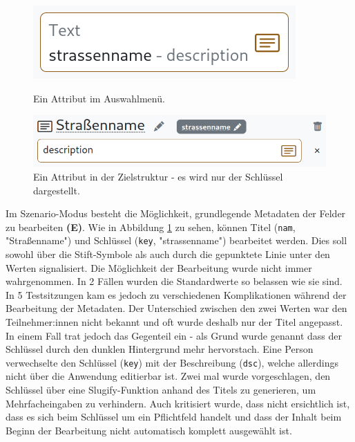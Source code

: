 \begin{figure}[!ht]
  \includegraphics[width=\linewidth]{assets/attribute-source.png}
  \caption{Ein Attribut im Auswahlmenü.}
  \label{fig:attribute-source}
  \endminipage
  \hfill
  \includegraphics[width=\linewidth]{assets/attribute-target.png}
  \caption{Ein Attribut in der Zielstruktur - es wird nur der Schlüssel dargestellt.}
  \label{fig:attribute-target}
  \endminipage
\end{figure}

Im Szenario-Modus besteht die Möglichkeit, grundlegende Metadaten der Felder zu bearbeiten \textbf{(E)}. Wie in Abbildung \ref{fig:attribute-target} zu sehen, können Titel (\texttt{nam}, "Straßenname") und Schlüssel (\texttt{key}, "strassenname") bearbeitet werden. Dies soll sowohl über die Stift-Symbole als auch durch die gepunktete Linie unter den Werten signalisiert. Die Möglichkeit der Bearbeitung wurde nicht immer wahrgenommen. In 2 Fällen wurden die Standardwerte so belassen wie sie sind. In 5 Testsitzungen kam es jedoch zu verschiedenen Komplikationen während der Bearbeitung der Metadaten. Der Unterschied zwischen den zwei Werten war den Teilnehmer:innen nicht bekannt und oft wurde deshalb nur der Titel angepasst. In einem Fall trat jedoch das Gegenteil ein - als Grund wurde genannt dass der Schlüssel durch den dunklen Hintergrund mehr hervorstach. Eine Person verwechselte den Schlüssel (\texttt{key}) mit der Beschreibung (\texttt{dsc}), welche allerdings nicht über die Anwendung editierbar ist. Zwei mal wurde vorgeschlagen, den Schlüssel über eine Slugify-Funktion anhand des Titels zu generieren, um Mehrfacheingaben zu verhindern. Auch kritisiert wurde, dass nicht ersichtlich ist, dass es sich beim Schlüssel um ein Pflichtfeld handelt und dass der Inhalt beim Beginn der Bearbeitung nicht automatisch komplett ausgewählt ist.

